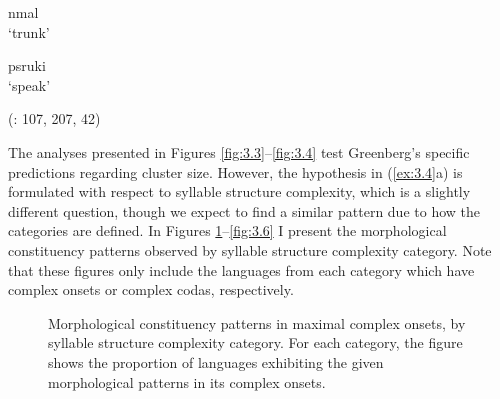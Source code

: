 \ex  nmal\\
\glt ‘trunk’

\ex  psruki\\
\glt ‘speak’

(\citealt{Lacrampe2014}: 107, 207, 42)
\z
\z

  The analyses presented in Figures \ref{fig:3.3}--\ref{fig:3.4} test Greenberg’s specific predictions regarding cluster size. However, the hypothesis in (\ref{ex:3.4}a) is formulated with respect to syllable structure complexity, which is a slightly different question, though we expect to find a similar pattern due to how the categories are defined. In Figures \ref{fig:3.5}--\ref{fig:3.6} I present the morphological constituency patterns observed by syllable structure complexity category. Note that these figures only include the languages from each category which have complex onsets or complex codas, respectively.


\begin{figure}
\caption{\label{fig:3.5}Morphological constituency patterns in maximal complex onsets, by syllable structure complexity category. For each category, the figure shows the proportion of languages exhibiting the given morphological patterns in its complex onsets.}
\end{figure}


